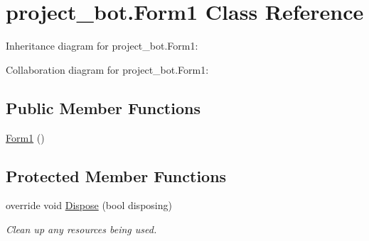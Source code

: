 \hypertarget{classproject__bot_1_1_form1}{}\section{project\+\_\+bot.\+Form1 Class Reference}
\label{classproject__bot_1_1_form1}


Inheritance diagram for project\+\_\+bot.\+Form1\+:


Collaboration diagram for project\+\_\+bot.\+Form1\+:
\subsection*{Public Member Functions}
\begin{DoxyCompactItemize}
\item 
\hyperlink{classproject__bot_1_1_form1_a2d02bb4e7647a42a58a86fd94de1d415}{Form1} ()
\end{DoxyCompactItemize}
\subsection*{Protected Member Functions}
\begin{DoxyCompactItemize}
\item 
override void \hyperlink{classproject__bot_1_1_form1_a6ef3949926be979fad231da4e2138d03}{Dispose} (bool disposing)
\begin{DoxyCompactList}\small\item\em Clean up any resources being used. \end{DoxyCompactList}\end{DoxyCompactItemize}

